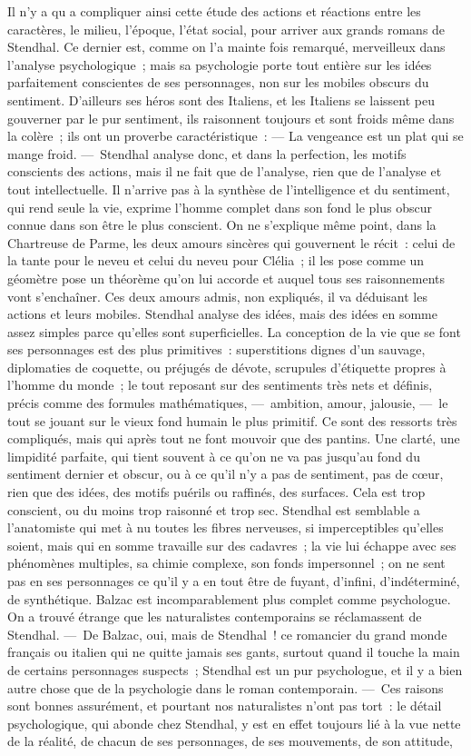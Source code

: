 \documentclass[french,twoside]{book} %
\begin{document}
Il n’y a qu a compliquer ainsi cette étude des actions et réactions entre les caractères, le milieu, l’époque, l’état social, pour arriver aux grands romans de Stendhal. Ce dernier est, comme on l’a mainte fois remarqué, merveilleux dans l’analyse psychologique ; mais sa psychologie porte tout entière sur les idées parfaitement conscientes de ses personnages, non sur les mobiles obscurs du sentiment. D’ailleurs ses héros sont des Italiens, et les Italiens se laissent peu gouverner par le pur sentiment, ils raisonnent toujours et sont froids même dans la colère ; ils ont un proverbe caractéristique : — La vengeance est un plat qui se mange froid. — Stendhal analyse donc, et dans la perfection, les motifs conscients des actions, mais il ne fait que de l’analyse, rien que de l’analyse et tout intellectuelle. Il n’arrive pas à la synthèse de l’intelligence et du sentiment, qui rend seule la vie, exprime l’homme complet dans son fond le plus obscur connue dans son être le plus conscient. On ne s’explique même point, dans la Chartreuse de Parme, les deux amours sincères qui gouvernent le récit : celui de la tante pour le neveu et celui du neveu pour Clélia ; il les pose comme un géomètre pose un théorème qu’on lui accorde et auquel tous ses raisonnements vont s’enchaîner. Ces deux amours admis, non expliqués, il va déduisant les actions et leurs mobiles. Stendhal analyse des idées, mais des idées en somme assez simples parce qu’elles sont superficielles. La conception de la vie que se font ses personnages est des plus primitives : superstitions dignes d’un sauvage, diplomaties de coquette, ou préjugés de dévote, scrupules d’étiquette propres à l’homme du monde ; le tout reposant sur des sentiments très nets et définis, précis comme des formules mathématiques, — ambition, amour, jalousie, — le tout se jouant sur le vieux fond humain le plus primitif. Ce sont des ressorts très compliqués, mais qui après tout ne font mouvoir que des pantins. Une clarté, une limpidité parfaite, qui tient souvent à ce qu’on ne va pas jusqu’au fond du sentiment dernier et obscur, ou à ce qu’il n’y a pas de sentiment, pas de cœur, rien que des idées, des motifs puérils ou raffinés, des surfaces. Cela est trop conscient, ou du moins trop raisonné et trop sec. Stendhal est semblable a l’anatomiste qui met à nu toutes les fibres nerveuses, si imperceptibles qu’elles soient, mais qui en somme travaille sur des cadavres ; la vie lui échappe avec ses phénomènes multiples, sa chimie complexe, son fonds impersonnel ; on ne sent pas en ses personnages ce qu’il y a en tout être de fuyant, d’infini, d’indéterminé, de synthétique. Balzac est incomparablement plus complet comme psychologue. On a trouvé étrange que les naturalistes contemporains se réclamassent de Stendhal. — De Balzac, oui, mais de Stendhal ! ce romancier du grand monde français ou italien qui ne quitte jamais ses gants, surtout quand il touche la main de certains personnages suspects ; Stendhal est un pur psychologue, et il y a bien autre chose que de la psychologie dans le roman contemporain. — Ces raisons sont bonnes assurément, et pourtant nos naturalistes n’ont pas tort : le détail psychologique, qui abonde chez Stendhal, y est en effet toujours lié à la vue nette de la réalité, de chacun de ses personnages, de ses mouvements, de son attitude, 
\end{document}
